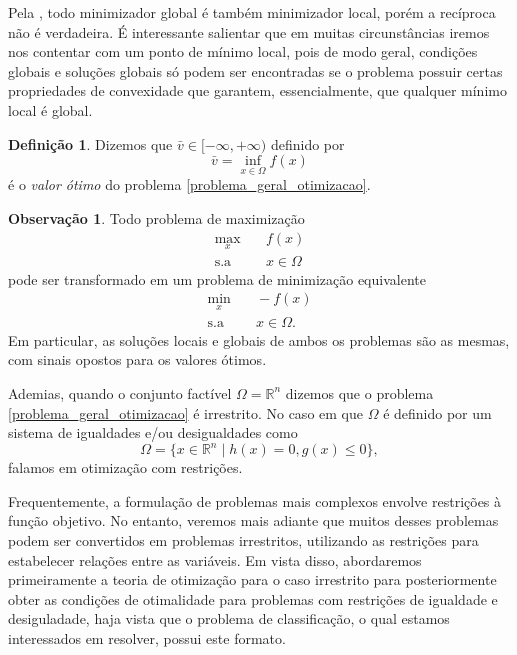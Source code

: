 \documentclass[12pt,a4paper]{scrartcl}
\def\RR{\mathds{R}}
\theoremstyle{definition}%
\newtheorem{defi}{Definição}
\newtheorem{obs}{Observação}
\begin{document}
Pela , todo minimizador global é também minimizador local, porém a recíproca não é verdadeira. É interessante salientar que em muitas circunstâncias iremos nos contentar com um ponto de mínimo local, pois de modo geral, condições globais e soluções globais só podem ser encontradas se o problema possuir certas propriedades de convexidade que garantem, essencialmente, que qualquer mínimo local é global.

\begin{defi} \label{defi:valor_otimo}
Dizemos que $\bar{v} \in [-\infty, +\infty )$ definido por
\[
\bar{v} = \inf_{x \in \Omega} f(x)
\]
é o \emph{valor ótimo} do problema \eqref{problema_geral_otimizacao}.
\end{defi}

\begin{obs}
Todo problema de maximização
\[
\begin{aligned}
\max_{x} & \quad f(x) \\
\text{s.a} & \quad x \in \Omega \end{aligned}
 \]
pode ser transformado em um problema de minimização equivalente
\[
\begin{aligned}
\min_{x} & \quad -f(x) \\
\text{s.a} & \quad x \in \Omega .\end{aligned}
\]
Em particular, as soluções locais e globais de ambos os problemas são as mesmas, com sinais opostos para os valores ótimos.
\end{obs} %



Ademias, quando o conjunto factível $\Omega = \RR^{n}$ dizemos que o problema \eqref{problema_geral_otimizacao} é irrestrito. No caso em que $\Omega$ é definido por um sistema de igualdades e/ou desigualdades como
\[
\Omega = \{ x\in \RR^{n} \mid h(x)=0, g(x) \leq 0 \},
\]
falamos em otimização com restrições.

Frequentemente, a formulação de problemas mais complexos envolve restrições à função objetivo. No entanto, veremos mais adiante que muitos desses problemas podem ser convertidos em problemas irrestritos, utilizando as restrições para estabelecer relações entre as variáveis. Em vista disso, abordaremos primeiramente a teoria de otimização para o caso irrestrito para posteriormente obter as condições de otimalidade para problemas com restrições de igualdade e desiguladade, haja vista que o problema de classificação, o qual estamos interessados em resolver, possui este formato.
\end{document}
